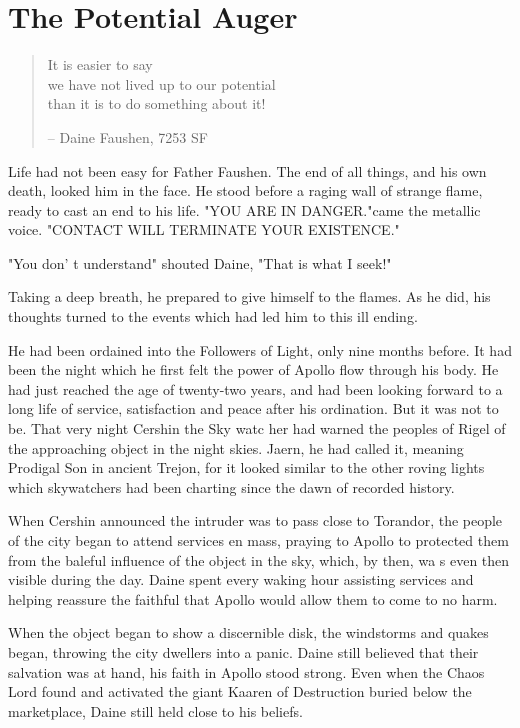\chapter{The Potential Auger}
\label{ch:augers}
\setlength{\columnsep}{\defcolwidth}
\begin{multicols*}{2}
\begin{quote}
\begin{center}
It is easier to say\\
we have not lived up to our potential\\
than it is to do something about it!
\end{center}
\hspace*{\fill} – Daine Faushen, 7253 SF
\end{quote}
Life had not been easy for Father Faushen. The end of all things, and his own death, looked him in the face. He stood before a raging wall of strange flame, ready to cast an end to his life.
"YOU ARE IN DANGER."came the metallic voice. "CONTACT WILL TERMINATE YOUR EXISTENCE."

"You don' t understand" shouted Daine, "That is what I seek!"

Taking a deep breath, he prepared to give himself to the flames. As he did, his thoughts turned to the events which had led him to this ill ending.

He had been ordained into the Followers of Light, only nine months before. It had been the night which he first felt the power of Apollo flow through his body. He had just reached the age of twenty-two years, and had been looking forward to a long life of service, satisfaction and peace after his ordination. But it was not to be. That very night Cershin the Sky watc her had warned the peoples of Rigel of the approaching object in the night skies. Jaern, he had called it, meaning Prodigal Son in ancient Trejon, for it looked similar to the other roving lights which skywatchers had been charting since the dawn of recorded history.

When Cershin announced the intruder was to pass close to Torandor, the people of the city began to attend services en mass, praying to Apollo to protected them from the baleful influence of the object in the sky, which, by then, wa s even then visible during the day. Daine spent every waking hour assisting services and helping reassure the faithful that Apollo would allow them to come to no harm.

When the object began to show a discernible disk, the windstorms and quakes began, throwing the city dwellers into a panic. Daine still believed that their salvation was at hand, his faith in Apollo stood strong. Even when the Chaos Lord found and activated the giant Kaaren of Destruction buried below the marketplace, Daine still held close to his beliefs.


\end{multicols*}
